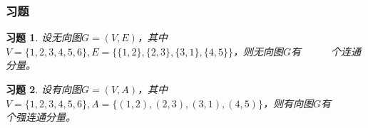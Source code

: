 \documentclass{beamer}
\begin{document}
\begin{CJK*}{UTF8}{gbsn}
\newtheorem{Exercise}{习题}

\begin{frame}
  \frametitle{习题}
  \begin{Exercise}\justifying\let\raggedright\justifying
    设无向图$G=(V,E)$，其中$V=\{1,2,3,4,5,6\}, E = \{\{1,2\},\{2,3\},\{3,1\},
    \{4,5\}\}$，则无向图$G$有\underline{$\quad\quad\quad$}个连通分量。
  \end{Exercise}
    \begin{Exercise}\justifying\let\raggedright\justifying
    设有向图$G=(V,A)$，其中$V=\{1,2,3,4,5,6\}, A =\{(1,2),(2,3),(3,1),
    (4,5)\}$，则有向图$G$有\underline{$\quad\quad\quad$}个强连通分量。
  \end{Exercise}

\end{frame}

\end{CJK*}
\end{document}
